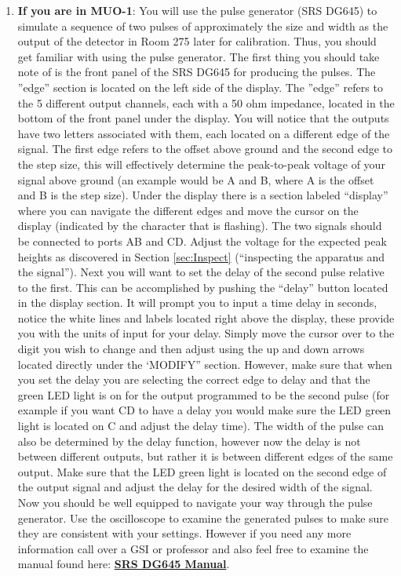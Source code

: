 \documentclass{../lab}
\begin{document}
\begin{enumerate}
    \item \textbf{If you are in MUO-1}: You will use the pulse generator (SRS DG645) to simulate a sequence of two pulses of approximately the size and width as the output of the detector in Room 275 later for calibration. Thus, you should get familiar with using the pulse generator. The first thing you should take note of is the front panel of the SRS DG645 for producing the pulses. The ''edge'' section is located on the left side of the display. The ''edge'' refers to the 5 different output channels, each with a 50 ohm impedance, located in the bottom of the front panel under the display. You will notice that the outputs have two letters associated with them, each located on a different edge of the signal. The first edge refers to the offset above ground and the second edge to the step size, this will effectively determine the peak-to-peak voltage of your signal above ground (an example would be A and B, where A is the offset and B is the step size). Under the display there is a section labeled ``display'' where you can navigate the different edges and move the cursor on the display (indicated by the character that is flashing). The two signals should be connected to ports AB and CD. Adjust the voltage for the expected peak heights as discovered in Section \ref{sec:Inspect} (``inspecting the apparatus and the signal''). Next you will want to set the delay of the second pulse relative to the first. This can be accomplished by pushing the ``delay'' button located in the display section. It will prompt you to input a time delay in seconds, notice the white lines and labels located right above the display, these provide you with the units of input for your delay. Simply move the cursor over to the digit you wish to change and then adjust using the up and down arrows located directly under the ‘MODIFY” section. However, make sure that when you set the delay you are selecting the correct edge to delay and that the green LED light is on for the output programmed to be the second pulse (for example if you want CD to have a delay you would make sure the LED green light is located on C and adjust the delay time). The width of the pulse can also be determined by the delay function, however now the delay is not between different outputs, but rather it is between different edges of the same output. Make sure that the LED green light is located on the second edge of the output signal and adjust the delay for the desired width of the signal. Now you should be well equipped to navigate your way through the pulse generator. Use the oscilloscope to examine the generated pulses to make sure they are consistent with your settings. However if you need any more information call over a GSI or professor and also feel free to examine the manual found here: \href{https://berkeley-physics111b.github.io/assets/pdf/oldwebsitestructure/DG645manual.pdf}{\textbf{SRS DG645 Manual}}.


\end{enumerate}
\end{document}

